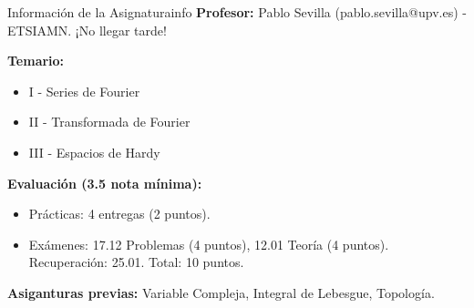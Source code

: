 \begin{nota}{Información de la Asignatura}{info}
\textbf{Profesor:} Pablo Sevilla (pablo.sevilla@upv.es) - ETSIAMN. ¡No llegar tarde!

\textbf{Temario:}
\begin{itemize}
    \item I - Series de Fourier
    \item II - Transformada de Fourier
    \item III - Espacios de Hardy
\end{itemize}
\textbf{Evaluación (3.5 nota mínima):}
\begin{itemize}
    \item Prácticas: 4 entregas (2 puntos).
    \item Exámenes: 17.12 Problemas (4 puntos), 12.01 Teoría (4 puntos). Recuperación: 25.01. Total: 10 puntos.
\end{itemize}

\textbf{Asiganturas previas:} Variable Compleja, Integral de Lebesgue, Topología.
\end{nota}